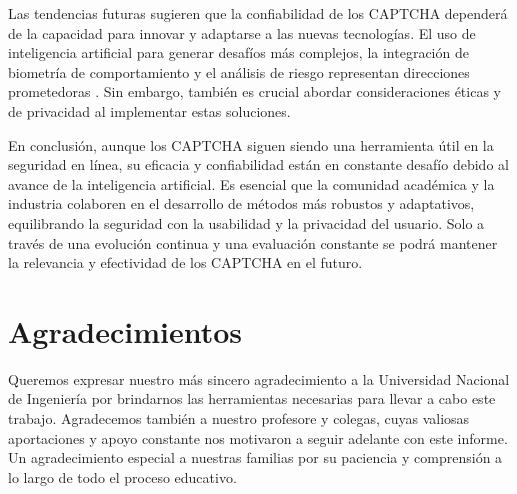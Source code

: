 \documentclass[conference]{IEEEtran}
\begin{document}
Las tendencias futuras sugieren que la confiabilidad de los CAPTCHA dependerá de la capacidad para innovar y adaptarse a las nuevas tecnologías. El uso de inteligencia artificial para generar desafíos más complejos, la integración de biometría de comportamiento y el análisis de riesgo representan direcciones prometedoras \cite{Sajjad2019, Murdoch2020}. Sin embargo, también es crucial abordar consideraciones éticas y de privacidad al implementar estas soluciones.

En conclusión, aunque los CAPTCHA siguen siendo una herramienta útil en la seguridad en línea, su eficacia y confiabilidad están en constante desafío debido al avance de la inteligencia artificial. Es esencial que la comunidad académica y la industria colaboren en el desarrollo de métodos más robustos y adaptativos, equilibrando la seguridad con la usabilidad y la privacidad del usuario. Solo a través de una evolución continua y una evaluación constante se podrá mantener la relevancia y efectividad de los CAPTCHA en el futuro.

\bigskip

\section*{Agradecimientos}
Queremos expresar nuestro más sincero agradecimiento a la Universidad Nacional de Ingeniería por brindarnos las herramientas necesarias para llevar a cabo este trabajo. Agradecemos también a nuestro profesore y colegas, cuyas valiosas aportaciones y apoyo constante nos motivaron a seguir adelante con este informe. Un agradecimiento especial a nuestras familias por su paciencia y comprensión a lo largo de todo el proceso educativo.

\bigskip



\end{document}
